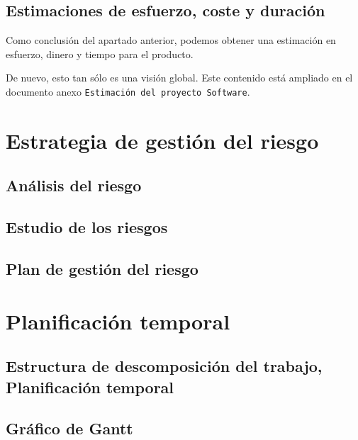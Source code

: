 \documentclass[spanish,a4paper,12pt]{report}	%
\begin{document}
	\section{Estimaciones de esfuerzo, coste y duración}
	Como conclusión del apartado anterior, podemos obtener una estimación en esfuerzo, dinero y tiempo para el producto.


	De nuevo, esto tan sólo es una visión global. Este contenido está ampliado en el documento anexo \texttt{Estimación del proyecto Software}.


\newpage
\mbox{}
\thispagestyle{empty}						%
\newpage
\setcounter{section}{0}

\chapter{Estrategia de gestión del riesgo}

	\section{Análisis del riesgo}

	\section{Estudio de los riesgos}

	\section{Plan de gestión del riesgo}

\newpage
\mbox{}
\thispagestyle{empty}						%
\newpage
\setcounter{section}{0}

\chapter{Planificación temporal}

	\section{Estructura de descomposición del trabajo, Planificación temporal}

	\section{Gráfico de  Gantt}
\end{document}
